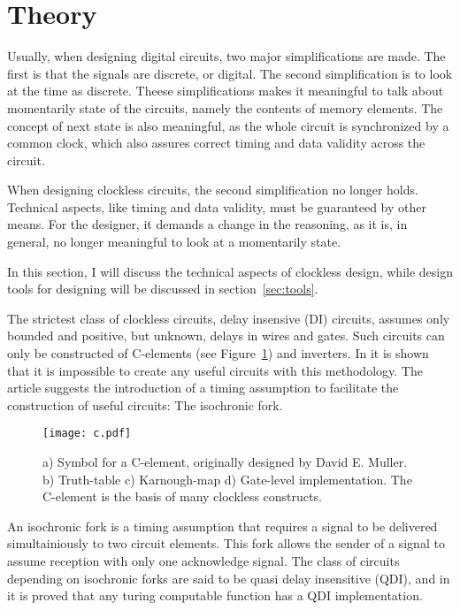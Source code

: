 \section{Theory}

Usually, when designing digital circuits, two major simplifications
are made. The first is that the signals are discrete, or digital. The
second simplification is to look at the time as discrete. Theese
simplifications makes it meaningful to talk about momentarily state of
the circuits, namely the contents of memory elements. The concept of
next state is also meaningful, as the whole circuit is synchronized by
a common clock, which also assures correct timing and data validity
across the circuit.

When designing clockless circuits, the second simplification no longer
holds. Technical aspects, like timing and data validity, must be
guaranteed by other means. For the designer, it demands a change in
the reasoning, as it is, in general, no longer meaningful to look at a
momentarily state.

In this section, I will discuss the technical aspects of clockless
design, while design tools for designing will be discussed in
section~\ref{sec:tools}.

The strictest class of clockless circuits, delay insensive (DI)
circuits, assumes only bounded and positive, but unknown, delays in
wires and gates. Such circuits can only be constructed of C-elements
(see Figure~\ref{fig:c}) and inverters. In \cite{dilimit} it is shown
that it is impossible to create any useful circuits with this
methodology. The article suggests the introduction of a timing
assumption to facilitate the construction of useful circuits: The
isochronic fork.

\begin{figure}[htbp]
  \centering
  \texttt{[image: c.pdf]}
  \caption{a) Symbol for a C-element, originally designed by David
    E. Muller. b) Truth-table c) Karnough-map d) Gate-level
    implementation. The C-element is the basis of many clockless
    constructs.}
  \label{fig:c}
\end{figure}

An isochronic fork is a timing assumption that requires a signal to be
delivered simultainiously to two circuit elements. This fork allows
the sender of a signal to assume reception with only one acknowledge
signal. The class of circuits depending on isochronic forks are said
to be quasi delay insensitive (QDI), and in \cite{turing} it is proved
that any turing computable function has a QDI implementation.

